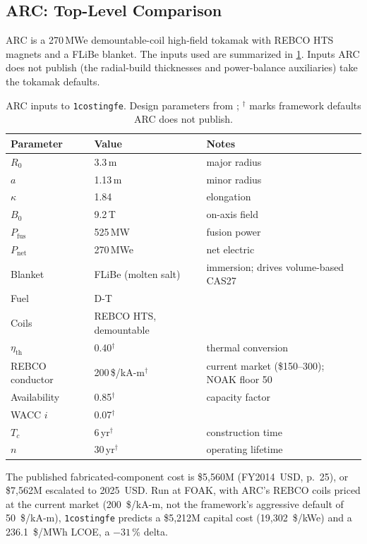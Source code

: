\documentclass{article}
\begin{document}
\subsection{ARC: Top-Level Comparison}
\label{sec:benchmark-arc}

ARC \citep{sorbom2015arc} is a 270\,MWe demountable-coil high-field
tokamak with REBCO HTS magnets and a FLiBe blanket. The inputs used
are summarized in \cref{tab:arc-inputs}. Inputs ARC does not publish (the
radial-build thicknesses and power-balance auxiliaries) take the tokamak
defaults.

\begin{table}[h]
\centering
\caption{ARC inputs to \texttt{1costingfe}. Design parameters from
\citet{sorbom2015arc}; $^\dagger$ marks framework defaults ARC does not
publish.}
\label{tab:arc-inputs}
\begin{tabular}{lll}
\toprule
Parameter & Value & Notes \\
\midrule
$R_0$ & 3.3\,m & major radius \\
$a$ & 1.13\,m & minor radius \\
$\kappa$ & 1.84 & elongation \\
$B_0$ & 9.2\,T & on-axis field \\
$P_\text{fus}$ & 525\,MW & fusion power \\
$P_\text{net}$ & 270\,MWe & net electric \\
Blanket & FLiBe (molten salt) & immersion; drives volume-based CAS27 \\
Fuel & D-T & \\
Coils & REBCO HTS, demountable & \\
\midrule
$\eta_\text{th}$ & 0.40$^\dagger$ & thermal conversion \\
REBCO conductor & 200\,\$/kA-m$^\dagger$ & current market (\$150--300); NOAK floor 50 \\
Availability & 0.85$^\dagger$ & capacity factor \\
WACC $i$ & 0.07$^\dagger$ & \\
$T_c$ & 6\,yr$^\dagger$ & construction time \\
$n$ & 30\,yr$^\dagger$ & operating lifetime \\
\bottomrule
\end{tabular}
\end{table}

The published fabricated-component cost is \$5{,}560M (FY2014~USD,
\citep{sorbom2015arc} p.~25), or \$7{,}562M escalated to 2025~USD.
Run at FOAK, with ARC's REBCO coils priced at the current market
(200~\$/kA-m, not the framework's aggressive default of 50~\$/kA-m),
\texttt{1costingfe} predicts a \$5{,}212M capital cost (19{,}302~\$/kWe)
and a 236.1~\$/MWh LCOE, a $-31$\,\% delta.
\end{document}
